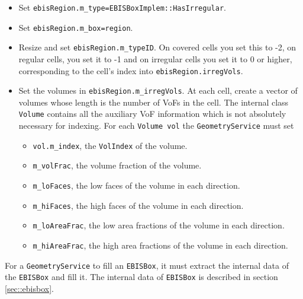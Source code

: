 \begin{itemize}
\begin{itemize}
 \item Set \verb/ebisRegion.m_type=EBISBoxImplem::HasIrregular/.
 \item Set \verb/ebisRegion.m_box=region/.
 \item Resize and set \verb/ebisRegion.m_typeID/.  On covered cells
        you set this to -2, on regular cells, you set it to -1
        and on irregular cells you set it to 0 or higher,
        corresponding to the cell's index into
        \verb/ebisRegion.irregVols/.
 \item Set the volumes in \verb/ebisRegion.m_irregVols/.  At each 
        cell, create a vector of volumes whose length is the
        number of VoFs in the cell.  
The internal class {\tt Volume} contains all
the auxiliary VoF information which is not absolutely
necessary for indexing.  For each {\tt Volume vol}
the {\tt GeometryService} must set 
\begin{itemize}
  \item \verb/vol.m_index/, the {\tt VolIndex} of the volume.
  \item \verb/m_volFrac/, the volume fraction of the volume.
  \item \verb/m_loFaces/, the low faces of the volume in each direction.
  \item \verb/m_hiFaces/, the high faces of the volume in each direction.
  \item \verb/m_loAreaFrac/, the low area fractions 
        of the volume in each direction.
  \item \verb/m_hiAreaFrac/, the high area fractions 
        of the volume in each direction.
\end{itemize}
\end{itemize}
\end{itemize}
For a {\tt GeometryService} to fill an {\tt EBISBox}, it must 
extract the internal data of the {\tt EBISBox} and fill it.
The internal data of {\tt EBISBox} is described in
section \ref{sec::ebisbox}.

